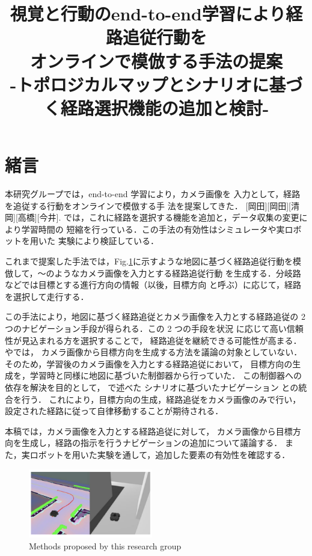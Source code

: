 \documentclass{sice-si}
\title{視覚と行動のend-to-end学習により経路追従行動を\\
オンラインで模倣する手法の提案\\
-トポロジカルマップとシナリオに基づく経路選択機能の追加と検討-\\} %
\begin{document}

\maketitle

\section{緒言}

本研究グループでは，end-to-end 学習により，カメラ画像を
入力として，経路を追従する行動をオンラインで模倣する手
法を提案してきた．\cite{okada2020}\cite{okada2021}\cite{kiyooka2021}
\cite{takahasi2023}\cite{imai2023}
[岡田][岡田][清岡][高橋][今井].
\cite{haruyama2022}\cite{fujiwara2023}
では，これに経路を選択する機能を追加と，データ収集の変更により学習時間の
短縮を行っている．この手法の有効性はシミュレータや実ロボットを用いた
実験により検証している．

これまで提案した手法では，Fig.\ref{fig:mapbase}に示すような地図に基づく経路追従行動を模
倣して，〜のようなカメラ画像を入力とする経路追従行動
を生成する．分岐路などでは目標とする進行方向の情報（以後，目標方向
と呼ぶ）に応じて，経路を選択して走行する．\par

この手法により，地図に基づく経路追従とカメラ画像を入力とする経路追従の
2 つのナビゲーション手段が得られる．この 2 つの手段を状況
に応じて高い信頼性が見込まれる方を選択することで，
経路追従を継続できる可能性が高まる．
\cite{haruyama2022}や\cite{fujiwara2023}では，
カメラ画像から目標方向を生成する方法を議論の対象としていない．
そのため，学習後のカメラ画像を入力とする経路追従において，
目標方向の生成を，学習時と同様に地図に基づいた制御器から行っていた．
この制御器への依存を解決を目的として，
\cite{haruyama2022}\cite{fujiwara2023}で述べた
シナリオに基づいたナビゲーション
\cite{shimada2020}
との統合を行う．
これにより，目標方向の生成，経路追従をカメラ画像のみで行い，
設定された経路に従って自律移動することが期待される．
\par
本稿では，カメラ画像を入力とする経路追従に対して，
カメラ画像から目標方向を生成し，経路の指示を行うナビゲーションの追加について議論する．
また，実ロボットを用いた実験を通して，追加した要素の有効性を確認する．
\begin{figure}[h!]
    \centering
     \includegraphics[height=30mm]{./figs/map_base.png}
     \caption{Methods proposed by this research group}\label{fig:mapbase}
\end{figure}
\end{document}
